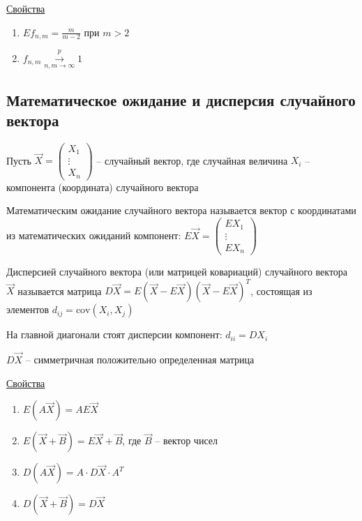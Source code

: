 \underline{Свойства}

\begin{enumerate}
    \item $E f_{n,m} = \frac{m}{m - 2}$ при $m > 2$

    \item $f_{n,m} \overset{p}{\underset{n, m \to \infty}{\longrightarrow}} 1$
\end{enumerate}


\subsection{Математическое ожидание и дисперсия случайного вектора}

Пусть $\vec X = \begin{pmatrix}X_1 \\ \vdots \\ X_n\end{pmatrix}$ -- случайный вектор, 
где случайная величина $X_i$ -- компонента (координата) случайного вектора

\Def Математическим ожидание случайного вектора называется вектор с координатами из математических ожиданий компонент: 
$E \vec X = \begin{pmatrix}E X_1 \\ \vdots \\ E X_n\end{pmatrix}$

\Def Дисперсией случайного вектора (или матрицей ковариаций) случайного вектора $\vec X$ называется
матрица $D \vec X = E (\vec X - E \vec X) (\vec X - E \vec X)^T$, состоящая из элементов $d_{ij} = \mathrm{cov} (X_i, X_j)$

\Notas На главной диагонали стоят дисперсии компонент: $d_{ii} = D X_i$

\Notas $D \vec X$ -- симметричная положительно определенная матрица

\underline{Свойства}

\begin{enumerate}
    \item $E (A \vec X) = A E \vec X$

    \item $E (\vec X + \vec B) = E \vec X + \vec B$, где $\vec B$ -- вектор чисел

    \item $D (A \vec X) = A \cdot D \vec X \cdot A^T$

    \item $D (\vec X + \vec B) = D \vec X$
\end{enumerate}

